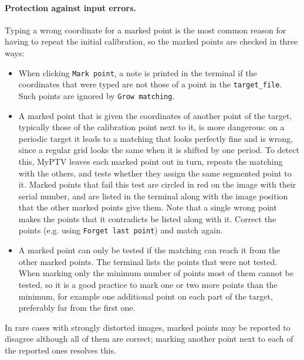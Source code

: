 \documentclass[10pt,a4paper]{article}
\begin{document}
\paragraph{Protection against input errors.} Typing a wrong coordinate for a marked point is the most common reason for having to repeat the initial calibration, so the marked points are checked in three ways:
\begin{itemize}
	\item When clicking \texttt{Mark point}, a note is printed in the terminal if the coordinates that were typed are not those of a point in the \texttt{target\_file}. Such points are ignored by \texttt{Grow matching}.
	
	\item A marked point that is given the coordinates of another point of the target, typically those of the calibration point next to it, is more dangerous: on a periodic target it leads to a matching that looks perfectly fine and is wrong, since a regular grid looks the same when it is shifted by one period. To detect this, MyPTV leaves each marked point out in turn, repeats the matching with the others, and tests whether they assign the same segmented point to it. Marked points that fail this test are circled in red on the image with their serial number, and are listed in the terminal along with the image position that the other marked points give them. Note that a single wrong point makes the points that it contradicts be listed along with it. Correct the points (e.g. using \texttt{Forget last point}) and match again.
	
	\item A marked point can only be tested if the matching can reach it from the other marked points. The terminal lists the points that were not tested. When marking only the minimum number of points most of them cannot be tested, so it is a good practice to mark one or two more points than the minimum, for example one additional point on each part of the target, preferably far from the first one.
\end{itemize}
In rare cases with strongly distorted images, marked points may be reported to disagree although all of them are correct; marking another point next to each of the reported ones resolves this.
\end{document}
